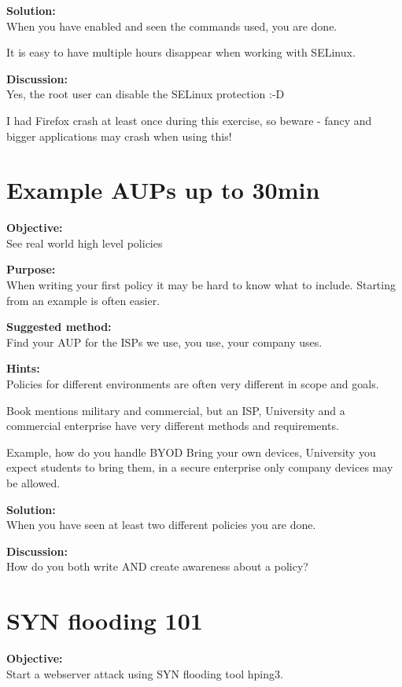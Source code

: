 \documentclass[a4paper,11pt,notitlepage]{report}
\begin{document}
{\bf Solution:}\\
When you have enabled and seen the commands used, you are done.

It is easy to have multiple hours disappear when working with SELinux.

{\bf Discussion:}\\
Yes, the root user can disable the SELinux protection :-D

I had Firefox crash at least once during this exercise, so beware - fancy and bigger applications may crash when using this!

\chapter{Example AUPs up to 30min}
\label{ex:example-AUP}

{\bf Objective:}\\
See real world high level policies

{\bf Purpose:}\\
When writing your first policy it may be hard to know what to include. Starting from an example is often easier.

{\bf Suggested method:}\\
Find your AUP for the ISPs we use, you use, your company uses.

{\bf Hints:}\\
Policies for different environments are often very different in scope and goals.

Book mentions military and commercial, but an ISP, University and a commercial enterprise have very different methods and requirements.

Example, how do you handle BYOD Bring your own devices, University you expect students to bring them, in a secure enterprise only company devices may be allowed.

{\bf Solution:}\\
When you have seen at least two different policies you are done.

{\bf Discussion:}\\
How do you both write AND create awareness about a policy?

\chapter{SYN flooding 101}
\label{ex:syn-flood-101}

{\bf Objective:}\\
Start a webserver attack using SYN flooding tool hping3.
\end{document}
